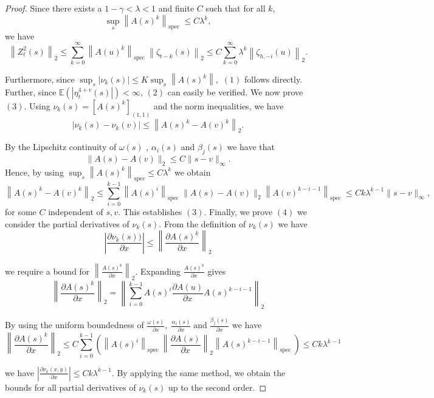 \documentclass[fleqn,11pt]{article}
\begin{document}
\begin{proof}
Since there exists a $1-\gamma<\lambda <1$ and finite $C$ such that for all $k$,
$$
\sup _s\left\|A(s)^k\right\|_{\text {spec }} \leq C \lambda^k,
$$
 we have
$$
\left\|Z_t^2(s)\right\|_2 \leq  \sum_{k=0}^{\infty}\left\|A(u)^k\right\|_{\text {spec }} \left\|\zeta_{t-k}(s)\right\|_2 \leq C \sum_{k=0}^{\infty} \lambda^k\left\|\zeta_{h,-i}(u)\right\|_2.
$$

Furthermore, since   $ \sup_s\left|\nu_k(s) \right| \leq K \sup_s \left\|A(s)^k\right\|,$ $(1)$ follows directly.
Further, since $\mathbb{E}\left(\left| \eta_t^{4+v}(s)\right| \right)<\infty$, $(2)$ can easily be verified.
We now prove $(3)$. Using $\nu_k(s)= [A(s)^k]_{(1, 1)}$ and the norm inequalities, we have
$$
 \left|\nu_k(s)-\nu_k(v)\right| \leq \left\|A(s)^k -A(v)^k \right\|_2  
.$$


By the Lipschitz continuity of $ \omega(s)$ , $\alpha_i(s)$ and $\beta_j(s)$ we have that $$\|A(s)-A(v)\|_2 \leq C\|s-v\|_\infty .$$ Hence, by using $\sup _s\left\|A(s)^k\right\|_{\text {spec}} \leq C \lambda^k $ we obtain
$$
\left\|A(s)^k-A(v)^k\right\|_2 \leq \sum_{i=0}^{k-1}\left\|A(s)^{i}\right\|_{\text {spec }} \| A(s)- A(v)\|_2\left\| A(v)^{k-i-1}\right\|_{ \text {spec }} \leq C k \lambda^{k-1}\|s-v\|_{\infty},
$$
for some $C$ independent of $s, v$. This establishes $(3)$.
Finally, we prove $(4)$ we consider the partial derivatives of $\nu_k(s)$. From the definition of $\nu_k(s)$ we have
$$
\left|\frac{\partial \nu_k(s))}{\partial x}\right|  \leq\left\|\frac{\partial A(s)^k }{\partial x}\right\|_2 
$$

 we require a bound for $\left\|\frac{ A(s)^k}{\partial x}\right\|_2$. Expanding $\frac{A(s)^k}{\partial x}$ gives
$$
\left\|\frac{\partial A(s)^k}{\partial x}\right\|_2=\left\|\sum_{i=0}^{k-1} A(s)^i \frac{\partial A(u)}{\partial x} A(s)^{k-i-1}\right\|_2
$$

By using the uniform boundedness of $\frac{ \omega(s)}{\partial x}, \; \frac{ \alpha_i(s)}{\partial x}\;  \text{and}  \; \frac{ \beta_j(s)}{\partial x}$ we have
$$
\left\|\frac{\partial A(s)^k}{\partial x}\right\|_2 \leq C \sum_{i=0}^{k-1}\left(\left\|A(s)^i\right\|_{\text {spec }} \left\|\frac{\partial A(s)}{\partial x}\right\|_2 \left\|A(s)^{k-i-1}\right\|_{\text {spec }}\right) \leq C k \lambda^{k-1}
$$

 we have $\left| \frac{\partial \nu_k(x,y)}{\partial x } \right| \leq C k \lambda^{k-1}$. By applying the same method, we obtain the bounds for all partial derivatives of $\nu_k(s)$ up to the second order.

\end{proof}
\end{document}
